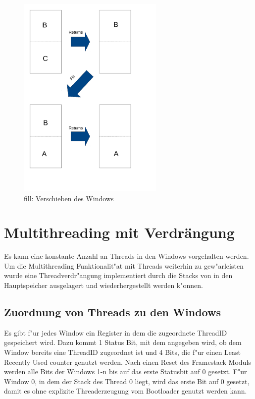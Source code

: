 \begin{figure}
	\centering
	\includegraphics[height = 10cm]{PS_RS_graphics/fill.pdf}
	\caption{fill: Verschieben des Windows}
\end{figure}
\section{Multithreading mit Verdr\"angung}
Es kann eine konstante Anzahl an Threads in den Windows vorgehalten werden. Um die Multithreading Funktionalit"at mit Threads weiterhin zu gew"arleisten wurde eine Threadverdr"angung implementiert durch die Stacks von in den Hauptspeicher ausgelagert und wiederhergestellt werden k"onnen.

\subsection{Zuordnung von Threads zu den Windows}
Es gibt f"ur jedes Window ein Register in dem die zugeordnete ThreadID gespeichert wird. Dazu kommt 1 Status Bit, mit dem angegeben wird, ob dem Window bereits eine ThreadID zugeordnet ist und 4 Bits, die f"ur einen Least Recently Used counter genutzt werden. Nach einen Reset des Framestack Moduls werden alle Bits der Windows 1-n bis auf das erste Statusbit auf 0 gesetzt. F"ur Window 0, in dem der Stack des Thread 0 liegt, wird das erste Bit auf 0 gesetzt, damit es ohne explizite Threaderzeugung vom Bootloader genutzt werden kann.  


